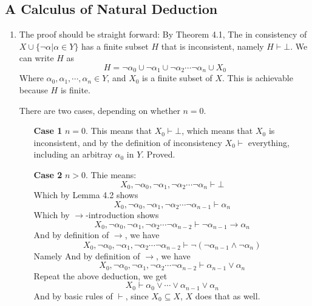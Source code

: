 \documentclass[a4paper, 12pt]{article}
\begin{document}
\subsection{A Calculus of Natural Deduction}
\begin{enumerate}
\item The proof should be straight forward: By Theorem 4.1, The in
  consistency of $X \cup \{ \neg \alpha | \alpha \in Y\}$ has a finite
  subset $H$ that is inconsistent, namely $H \vdash \bot$. We can
  write $H$ as 
  \[
  H =  \neg \alpha_0 \cup \neg \alpha_1 \cup \neg \alpha_2 \cdots \neg \alpha_n \cup X_0
  \]
  Where $\alpha_0, \alpha_1, \cdots, \alpha_n \in Y$, and $X_0$ is a
  finite subset of $X$. This is achievable because $H$ is finite.

  
  There are two cases, depending on whether $n = 0$.


  \begin{itemize}
  \item[\textbf{Case 1}] $n = 0$. This means that $X_0 \vdash \bot$,
    which means that $X_0$ is inconsistent, and by the definition of
    inconsistency $X_0 \vdash$ everything, including an arbitray
    $\alpha_0$ in $Y$. Proved.

  \item[\textbf{Case 2}] $n > 0$. Thie means:
    \[
    X_0 , \neg \alpha_0 , \neg \alpha_1 , \neg \alpha_2 \cdots \neg \alpha_n
    \vdash \bot
    \]
    Which by Lemma 4.2 shows 
    \[
    X_0 , \neg \alpha_0 , \neg \alpha_1 , \neg \alpha_2 \cdots \neg \alpha_{n-1}
    \vdash \alpha_n
    \]
    Which by $\rightarrow$-introduction shows 
    \[
    X_0 , \neg \alpha_0 , \neg \alpha_1 , \neg \alpha_2 \cdots \neg \alpha_{n-2}
    \vdash \neg \alpha_{n-1} \rightarrow \alpha_n
    \]
    And by definition of $\rightarrow$, we have 
    \[
    X_0 , \neg \alpha_0 , \neg \alpha_1 , \neg \alpha_2 \cdots \neg \alpha_{n-2}
    \vdash \neg(\neg \alpha_{n-1} \wedge \neg \alpha_n)
    \]
    Namely
    And by definition of $\rightarrow$, we have 
    \[
    X_0 , \neg \alpha_0 , \neg \alpha_1 , \neg \alpha_2 \cdots \neg \alpha_{n-2}
    \vdash \alpha_{n-1} \vee \alpha_n
    \]
    Repeat the above deduction, we get
    \[
    X_0 \vdash \alpha_0 \vee \cdots \vee \alpha_{n-1} \vee \alpha_n
    \]
    And by basic rules of $\vdash$, since $X_0 \subseteq X$, $X$ does
    that as well.

  \end{itemize}


  
  
\end{enumerate}
\end{document}
